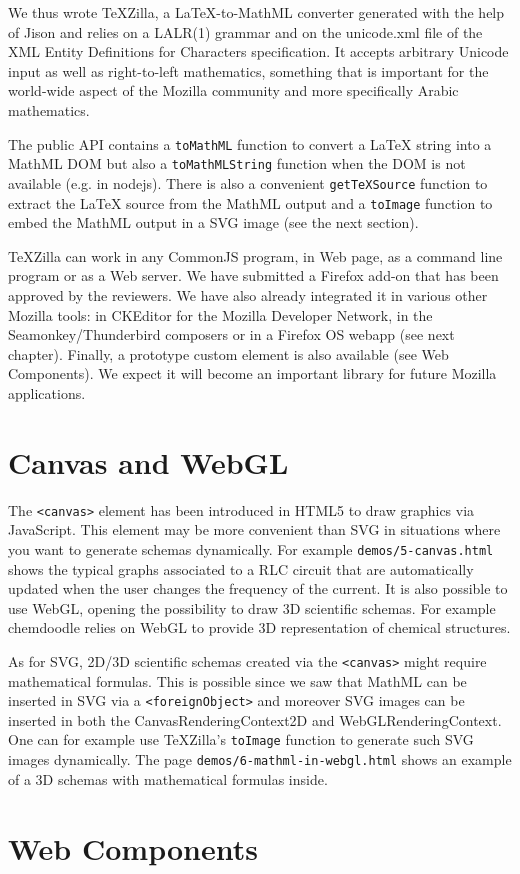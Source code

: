 We thus wrote TeXZilla, a LaTeX-to-MathML converter generated with the help of
Jison and relies on a LALR(1) grammar and on the unicode.xml file of
the XML Entity Definitions for Characters specification. It accepts arbitrary
Unicode input as well as right-to-left mathematics, something that is important
for the world-wide aspect of the Mozilla community and more specifically
Arabic mathematics.

The public API contains a {\tt toMathML} function to convert a LaTeX string
into a MathML DOM but also a {\tt toMathMLString} function when the DOM is
not available (e.g. in nodejs). There is also a convenient {\tt getTeXSource}
function to extract the LaTeX source from the MathML output and a
{\tt toImage} function to embed the MathML output in a SVG image (see the next
section).

TeXZilla can work in any CommonJS program, in Web page, as a command line
program or as a Web server. We have submitted a Firefox add-on
that has been approved by the reviewers. We have also already integrated it in
various other Mozilla tools: in CKEditor for the Mozilla Developer Network,
in the Seamonkey/Thunderbird composers or in a Firefox OS webapp (see next
chapter). Finally, a prototype {\tt <x-tex>} custom element is also available
(see Web Components). We expect it will become an important library for future
Mozilla applications.

\section{Canvas and WebGL}

The {\tt <canvas>} element has been introduced in HTML5 to draw graphics via
JavaScript. This element may be more convenient than SVG in situations where
you want to generate schemas dynamically. For example {\tt demos/5-canvas.html}
shows the typical graphs associated to a RLC circuit that are automatically
updated when the user changes the frequency of the current. It is also possible
to use WebGL, opening the possibility to draw 3D scientific schemas. For example
chemdoodle relies on WebGL to provide 3D representation of chemical structures.

As for SVG, 2D/3D scientific schemas created via the {\tt <canvas>} might
require mathematical formulas. This is possible since we saw that MathML can be
inserted in SVG via a {\tt <foreignObject>} and moreover SVG images can be
inserted in both the CanvasRenderingContext2D and WebGLRenderingContext. One
can for example use TeXZilla's {\tt toImage} function to generate such SVG
images dynamically. The page {\tt demos/6-mathml-in-webgl.html} shows an
example of a 3D schemas with mathematical formulas inside.

\section{Web Components}

